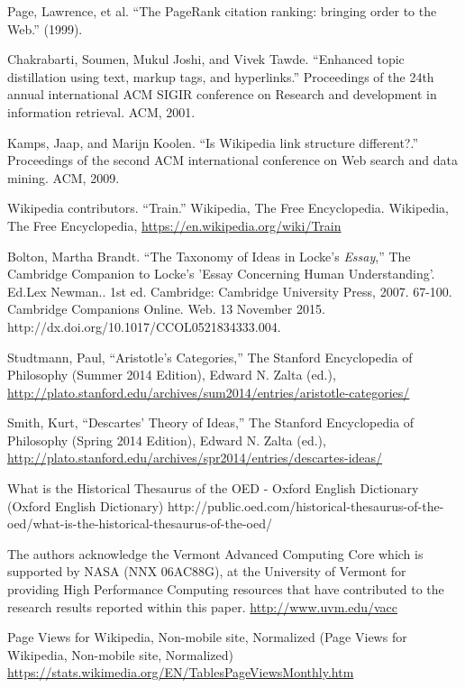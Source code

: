 \documentclass[pre,twocolumn,twoside,superscriptaddress,floatfix, aps, 10pt]{revtex4-1}
\begin{document}
\begin{thebibliography}{1}
       Page, Lawrence, et al. ``The PageRank citation ranking: bringing order to the Web.'' (1999).

       Chakrabarti, Soumen, Mukul Joshi, and Vivek Tawde. ``Enhanced topic distillation using text, markup tags, and hyperlinks.'' Proceedings of the 24th annual international ACM SIGIR conference on Research and development in information retrieval. ACM, 2001.

       Kamps, Jaap, and Marijn Koolen. ``Is Wikipedia link structure different?.'' Proceedings of the second ACM international conference on Web search and data mining. ACM, 2009.
          
       Wikipedia contributors. ``Train.'' Wikipedia, The Free Encyclopedia. Wikipedia, The Free Encyclopedia, 
          \url{https://en.wikipedia.org/wiki/Train}

     Bolton, Martha Brandt. ``The Taxonomy of Ideas in Locke’s {\it Essay},'' The Cambridge Companion to Locke's 'Essay Concerning Human Understanding'. Ed.Lex Newman.. 1st ed. Cambridge: Cambridge University Press, 2007. 67-100. Cambridge Companions Online. Web. 13 November 2015. http://dx.doi.org/10.1017/CCOL0521834333.004.

     Studtmann, Paul, ``Aristotle's Categories,'' The Stanford Encyclopedia of Philosophy (Summer 2014 Edition), Edward N. Zalta (ed.), \url{http://plato.stanford.edu/archives/sum2014/entries/aristotle-categories/}

     Smith, Kurt, ``Descartes' Theory of Ideas,'' The Stanford Encyclopedia of Philosophy (Spring 2014 Edition), Edward N. Zalta (ed.), \url{http://plato.stanford.edu/archives/spr2014/entries/descartes-ideas/}


     What is the Historical Thesaurus of the OED - Oxford English Dictionary (Oxford English Dictionary)
    http://public.oed.com/historical-thesaurus-of-the-oed/what-is-the-historical-thesaurus-of-the-oed/

     The authors acknowledge the Vermont Advanced Computing Core which is supported by NASA (NNX 06AC88G), at the University of Vermont for providing High Performance Computing resources that have contributed to the research results reported within this paper.
    \url{http://www.uvm.edu/vacc}

     Page Views for Wikipedia, Non-mobile site, Normalized (Page Views for Wikipedia, Non-mobile site, Normalized)
    \url{https://stats.wikimedia.org/EN/TablesPageViewsMonthly.htm}


\end{thebibliography}
\end{document}
